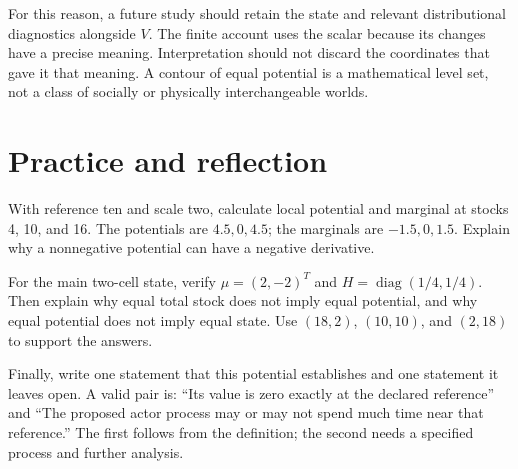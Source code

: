 For this reason, a future study should retain the state and relevant distributional diagnostics alongside \(V\). The finite account uses the scalar because its changes have a precise meaning. Interpretation should not discard the coordinates that gave it that meaning. A contour of equal potential is a mathematical level set, not a class of socially or physically interchangeable worlds.

\section{Practice and reflection}
With reference ten and scale two, calculate local potential and marginal at stocks 4, 10, and 16. The potentials are \(4.5,0,4.5\); the marginals are \(-1.5,0,1.5\). Explain why a nonnegative potential can have a negative derivative.

For the main two-cell state, verify \(\mu=(2,-2)^T\) and \(H=\operatorname{diag}(1/4,1/4)\). Then explain why equal total stock does not imply equal potential, and why equal potential does not imply equal state. Use \((18,2)\), \((10,10)\), and \((2,18)\) to support the answers.

Finally, write one statement that this potential establishes and one statement it leaves open. A valid pair is: ``Its value is zero exactly at the declared reference'' and ``The proposed actor process may or may not spend much time near that reference.'' The first follows from the definition; the second needs a specified process and further analysis.
